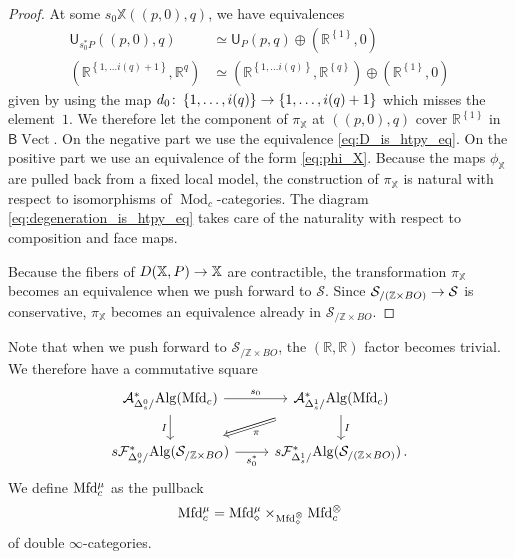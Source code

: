 \documentclass[10pt]{amsart}
\numberwithin{equation}{section}
\theoremstyle{definition}
\DeclareMathOperator{\Mod}{Mod}
\DeclareMathOperator{\Vect}{Vect}
\newcommand{\Mfd}{\mathrm{Mfd}\vphantom{d}}
\newcommand{\Alg}{\mathrm{Alg}\vphantom{z}}
\newcommand{\bZ}{\mathbb{Z}}
\newcommand{\bR}{\mathbb{R}}
\newcommand{\bX}{\mathbb{X}}
\newcommand{\cA}{\mathcal{A}}
\newcommand{\cS}{\mathcal{S}}
\newcommand{\cF}{\mathcal{F}}
\newcommand{\sfB}{\mathsf{B}}
\newcommand{\sfU}{\mathsf{U}}
\renewcommand{\to}{\mathchoice{\longrightarrow}{\rightarrow}{}{}}
\begin{document}
\begin{proof}
	At some $s_{0}\bX((p,0),q)$, we have equivalences
	\begin{align}\label{eq:D_is_htpy_eq}
		\sfU_{s_{0}^{*}P}( (p,0), q ) & \simeq \sfU_{P}(p,q) \oplus (\bR^{ \left\{ 1\right\} }, 0) \\
		(\bR^{ \left\{ 1,\dots i(q)+1  \right\}}, \bR^{q}  ) &\simeq (\bR^{ \left\{ 1,\dots i(q) \right\}}, \bR^{ \left\{ q\right\}} ) \oplus (\bR^{ \left\{ 1\right\}}, 0)  \nonumber
	\end{align}
	given by using the map $d_{0} \colon \left\{ 1,\dots , i(q)\right\} \to \left\{ 1,\dots, i(q)+1\right\}$ which misses the element~$1$.
  We therefore let the component of $\pi_{\bX}$ at $( (p,0),q)$ cover $\bR^{ \left\{ 1\right\}}$ in $\sfB\Vect$.
  On the negative part we use the equivalence \eqref{eq:D_is_htpy_eq}.
  On the positive part we use an equivalence of the form \eqref{eq:phi_X}.
  Because the maps $\phi_{\bX}$ are pulled back from a fixed local model, the construction of $\pi_{\bX}$ is natural with respect to isomorphisms of $\Mod_{c}$-categories.
  The diagram \eqref{eq:degeneration_is_htpy_eq} takes care of the naturality with respect to composition and face maps.

	Because the fibers of $D(\bX,P) \to \bX$ are contractible, the transformation $\pi_{\bX}$ becomes an equivalence when we push forward to $\cS$. Since $\cS_{/ (\bZ\times BO)}\to \cS$ is conservative, $\pi_{\bX}$ becomes an equivalence already in $\cS_{/\bZ\times BO}$.
\end{proof}
Note that when we push forward to $\cS_{/\bZ\times BO}$, the $(\bR,\bR)$ factor becomes trivial.
We therefore have a commutative square
	\begin{equation}\label{eq:degeneration_is_htpy_eq_2}
	\begin{tikzcd}
		\cA_{\Delta^{0}_{s}/}^{*}\Alg(\Mfd_{c}) \arrow[r,"s_{0}"] \arrow[d, "{I}"']      &   \cA_{\Delta_{s}^{1}/}^{*}\Alg(\Mfd_{c}) \arrow[dl, "\pi", Rightarrow, shorten=1em]  \arrow[d, "I"] \\
		s\cF_{\Delta^{0}_{s}/}^{*}\Alg(\cS_{/ \bZ\times BO})  \arrow[r, "s_{0}^{*}"']               &  s\cF_{\Delta^{1}_{s}/}^{*}\Alg(\cS_{/ (\bZ\times BO)}) \, .
	\end{tikzcd}
\end{equation}
We define $\Mfd^{\mu}_{c}$ as the pullback
\begin{align*}
	\Mfd^{\mu}_{c} = \Mfd_{\diamond}^{\mu}\times_{ \Mfd_{\diamond}^{\otimes} } \Mfd_{c}^{\otimes}
\end{align*}
of double $\infty$-categories.
\end{document}

